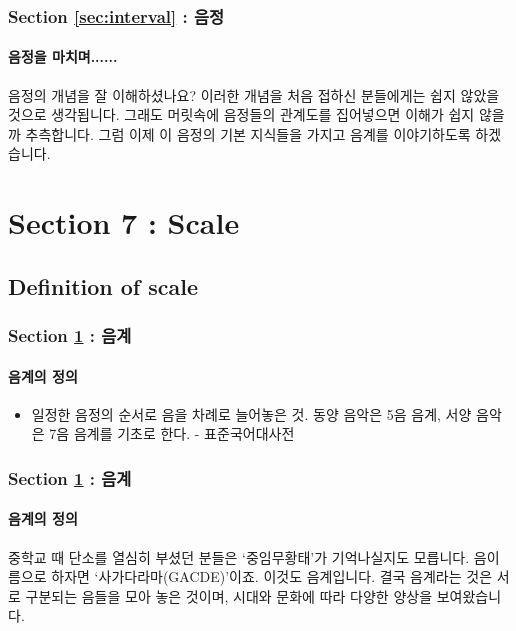 \documentclass{beamer}
\begin{document}
	\begin{frame}
		\frametitle{Section \ref{sec:interval} : 음정}
		\framesubtitle{음정을 마치며......}
		음정의 개념을 잘 이해하셨나요? 이러한 개념을 처음 접하신 분들에게는 쉽지 않았을 것으로 생각됩니다. 그래도 머릿속에 음정들의 관계도를 집어넣으면 이해가 쉽지 않을까 추측합니다. 그럼 이제 이 음정의 기본 지식들을 가지고 음계를 이야기하도록 하겠습니다.
	\end{frame}
	
	\section{Section 7 : Scale}\label{sec:scale}
	\subsection{Definition of scale}
	\begin{frame}
		\frametitle{Section \ref{sec:scale} : 음계}
		\framesubtitle{음계의 정의}
		\begin{definition}[음계, 音階, Scale]
			\begin{itemize}
				\item 일정한 음정의 순서로 음을 차례로 늘어놓은 것. 동양 음악은 5음 음계, 서양 음악은 7음 음계를 기초로 한다. - 표준국어대사전
			\end{itemize}
		\end{definition}
	\end{frame}
	
	\begin{frame}
		\frametitle{Section \ref{sec:scale} : 음계}
		\framesubtitle{음계의 정의}
		중학교 때 단소를 열심히 부셨던 분들은 `중임무황태'가 기억나실지도 모릅니다. 음이름으로 하자면 `사가다라마(GACDE)'이죠. 이것도 음계입니다. 결국 음계라는 것은 서로 구분되는 음들을 모아 놓은 것이며, 시대와 문화에 따라 다양한 양상을 보여왔습니다. 
	\end{frame}
	
\end{document}
